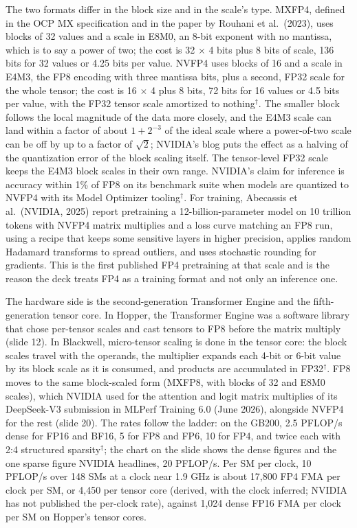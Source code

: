 \documentclass[11pt,letterpaper]{article}
\begin{document}
The two formats differ in the block size and in the scale's type. MXFP4, defined in the OCP MX specification and in the paper by Rouhani et al.\ (2023), uses blocks of 32 values and a scale in E8M0, an 8-bit exponent with no mantissa, which is to say a power of two; the cost is 32 $\times$ 4 bits plus 8 bits of scale, 136 bits for 32 values or 4.25 bits per value. NVFP4 uses blocks of 16 and a scale in E4M3, the FP8 encoding with three mantissa bits, plus a second, FP32 scale for the whole tensor; the cost is 16 $\times$ 4 plus 8 bits, 72 bits for 16 values or 4.5 bits per value, with the FP32 tensor scale amortized to nothing$^\dagger$. The smaller block follows the local magnitude of the data more closely, and the E4M3 scale can land within a factor of about $1 + 2^{-3}$ of the ideal scale where a power-of-two scale can be off by up to a factor of $\sqrt{2}$; NVIDIA's blog puts the effect as a halving of the quantization error of the block scaling itself. The tensor-level FP32 scale keeps the E4M3 block scales in their own range. NVIDIA's claim for inference is accuracy within 1\% of FP8 on its benchmark suite when models are quantized to NVFP4 with its Model Optimizer tooling$^\dagger$. For training, Abecassis et al.\ (NVIDIA, 2025) report pretraining a 12-billion-parameter model on 10 trillion tokens with NVFP4 matrix multiplies and a loss curve matching an FP8 run, using a recipe that keeps some sensitive layers in higher precision, applies random Hadamard transforms to spread outliers, and uses stochastic rounding for gradients. This is the first published FP4 pretraining at that scale and is the reason the deck treats FP4 as a training format and not only an inference one.

The hardware side is the second-generation Transformer Engine and the fifth-generation tensor core. In Hopper, the Transformer Engine was a software library that chose per-tensor scales and cast tensors to FP8 before the matrix multiply (slide 12). In Blackwell, micro-tensor scaling is done in the tensor core: the block scales travel with the operands, the multiplier expands each 4-bit or 6-bit value by its block scale as it is consumed, and products are accumulated in FP32$^\dagger$. FP8 moves to the same block-scaled form (MXFP8, with blocks of 32 and E8M0 scales), which NVIDIA used for the attention and logit matrix multiplies of its DeepSeek-V3 submission in MLPerf Training 6.0 (June 2026), alongside NVFP4 for the rest (slide 20). The rates follow the ladder: on the GB200, 2.5 PFLOP/s dense for FP16 and BF16, 5 for FP8 and FP6, 10 for FP4, and twice each with 2:4 structured sparsity$^\dagger$; the chart on the slide shows the dense figures and the one sparse figure NVIDIA headlines, 20 PFLOP/s. Per SM per clock, 10 PFLOP/s over 148 SMs at a clock near 1.9 GHz is about 17{,}800 FP4 FMA per clock per SM, or 4{,}450 per tensor core (derived, with the clock inferred; NVIDIA has not published the per-clock rate), against 1{,}024 dense FP16 FMA per clock per SM on Hopper's tensor cores.
\end{document}
